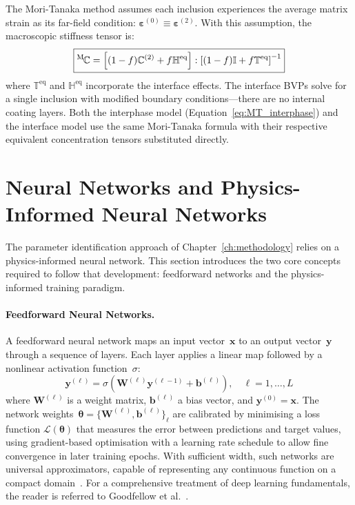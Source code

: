 \documentclass[oneside, 12pt, a4paper, bibliography=totoc]{book}
\newcommand{\bs}[1]{\bm{#1}}                       %
\begin{document}
The Mori-Tanaka method assumes each inclusion experiences the average matrix strain as its far-field condition: $\bs{\varepsilon}^{(0)} \equiv \bs{\varepsilon}^{(2)}$. With this assumption, the macroscopic stiffness tensor is:
%
\begin{equation}
    \boxed{{}^{\mathrm{M}}\hspace{-1pt}\mathbb{C} = \left[(1-f)\mathbb{C}^{(2)} + f\mathbb{H}^{\text{eq}}\right] : \left[(1-f)\mathbb{I} + f\mathbb{T}^{\text{eq}}\right]^{-1}}
    \label{eq:MT_interface}
\end{equation}
%
where $\mathbb{T}^{\text{eq}}$ and $\mathbb{H}^{\text{eq}}$ incorporate the interface effects. The interface BVPs solve for a single inclusion with modified boundary conditions---there are no internal coating layers. Both the interphase model (Equation~\eqref{eq:MT_interphase}) and the interface model use the same Mori-Tanaka formula with their respective equivalent concentration tensors substituted directly.



\section{Neural Networks and Physics-Informed Neural Networks}
\label{sec:nn_background}

The parameter identification approach of Chapter~\ref{ch:methodology} relies on a physics-informed neural network. This section introduces the two core concepts required to follow that development: feedforward networks and the physics-informed training paradigm.

\paragraph{Feedforward Neural Networks.}
A feedforward neural network maps an input vector~$\bs{x}$ to an output vector~$\bs{y}$ through a sequence of layers. Each layer applies a linear map followed by a nonlinear activation function~$\sigma$:
%
\begin{equation}
    \bs{y}^{(\ell)} = \sigma\!\left(\bs{W}^{(\ell)} \bs{y}^{(\ell-1)} + \bs{b}^{(\ell)}\right), \quad \ell = 1, \ldots, L
    \label{eq:nn_layer}
\end{equation}
%
where $\bs{W}^{(\ell)}$ is a weight matrix, $\bs{b}^{(\ell)}$ a bias vector, and $\bs{y}^{(0)} = \bs{x}$. The network weights~$\bs{\theta} = \{\bs{W}^{(\ell)}, \bs{b}^{(\ell)}\}_\ell$ are calibrated by minimising a loss function $\mathcal{L}(\bs{\theta})$ that measures the error between predictions and target values, using gradient-based optimisation with a learning rate schedule to allow fine convergence in later training epochs. With sufficient width, such networks are universal approximators, capable of representing any continuous function on a compact domain~\cite{Hornik1989, Cybenko1989}. For a comprehensive treatment of deep learning fundamentals, the reader is referred to Goodfellow et al.~\cite{Goodfellow2016}.
\end{document}
